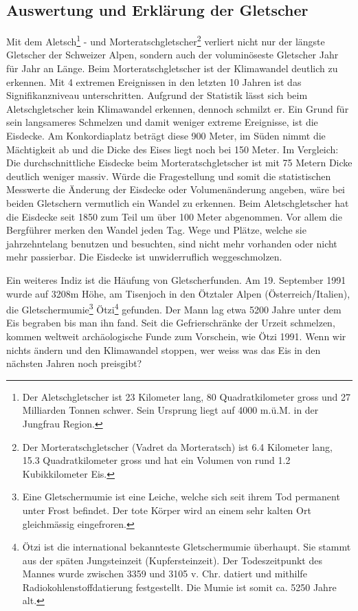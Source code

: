 \begin{refsection}
\subsection{Auswertung und Erklärung der Gletscher}
Mit dem Aletsch\footnote{%
Der Aletschgletscher ist 23 Kilometer lang, 80 Quadratkilometer gross und 27 Milliarden Tonnen schwer. Sein Ursprung liegt auf 4000 m.ü.M. in der Jungfrau Region.}
- und Morteratschgletscher\footnote{%
Der Morteratschgletscher (Vadret da Morteratsch) ist 6.4 Kilometer lang, 15.3 Quadratkilometer gross und hat ein Volumen von rund 1.2 Kubikkilometer Eis.}
verliert nicht nur der längste Gletscher der Schweizer Alpen, sondern auch der voluminöseste Gletscher Jahr für Jahr an Länge. Beim Morteratschgletscher ist der Klimawandel deutlich zu erkennen. Mit 4 extremen Ereignissen in den letzten 10 Jahren ist das Signifikanzniveau unterschritten. Aufgrund der Statistik lässt sich beim Aletschgletscher kein Klimawandel erkennen, dennoch schmilzt er. Ein Grund für sein langsameres Schmelzen und damit weniger extreme Ereignisse, ist die Eisdecke. Am Konkordiaplatz beträgt diese 900 Meter, im Süden nimmt die Mächtigkeit ab und die Dicke des Eises liegt noch bei 150 Meter. Im Vergleich: Die durchschnittliche Eisdecke beim Morteratschgletscher ist mit 75 Metern Dicke deutlich weniger massiv. 
Würde die Fragestellung und somit die statistischen Messwerte die Änderung der Eisdecke oder Volumenänderung angeben, wäre bei beiden Gletschern vermutlich ein Wandel zu erkennen. Beim Aletschgletscher hat die Eisdecke seit 1850 zum Teil um über 100 Meter abgenommen. Vor allem die Bergführer merken den Wandel jeden Tag. Wege und Plätze, welche sie jahrzehntelang benutzen und besuchten, sind nicht mehr vorhanden oder nicht mehr passierbar. Die Eisdecke ist unwiderruflich weggeschmolzen.

Ein weiteres Indiz ist die Häufung von Gletscherfunden. Am 19. September 1991 wurde auf 3208m Höhe, am Tisenjoch in den Ötztaler Alpen (Österreich/Italien), die Gletschermumie\footnote{%
Eine Gletschermumie ist eine Leiche, welche sich seit ihrem Tod permanent unter Frost befindet. Der tote Körper wird an einem sehr kalten Ort gleichmässig eingefroren.}
Ötzi\footnote{%
Ötzi ist die international bekannteste Gletschermumie überhaupt. Sie stammt aus der späten Jungsteinzeit (Kupfersteinzeit). Der Todeszeitpunkt des Mannes wurde zwischen 3359 und 3105 v. Chr. datiert und mithilfe Radiokohlenstoffdatierung festgestellt. Die Mumie ist somit ca. 5250 Jahre alt.}
gefunden. Der Mann lag etwa 5200 Jahre unter dem Eis begraben bis man ihn fand. Seit die Gefrierschränke der Urzeit schmelzen, kommen weltweit archäologische Funde zum Vorschein, wie Ötzi 1991. Wenn wir nichts ändern und den Klimawandel stoppen, wer weiss was das Eis in den nächsten Jahren noch preisgibt?



\end{refsection}
